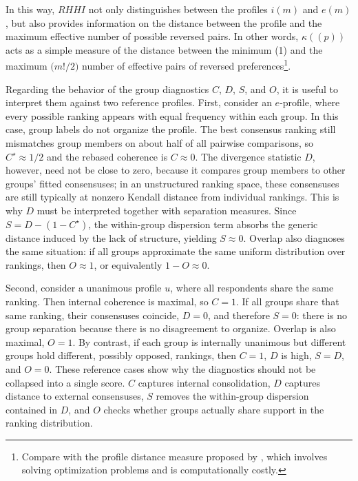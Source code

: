 \documentclass[12pt]{article}
\begin{document}
In this way, \(RHHI\) not only distinguishes between the profiles \(i(m)\) and \(e(m)\), but also provides information on the distance between the profile and the maximum effective number of possible reversed pairs. In other words, \(\kappa((p))\) acts as a simple measure of the distance between the minimum (1) and the maximum \(\bigl(m!/2\bigr)\) number of effective pairs of reversed preferences\footnote{Compare with the profile distance measure proposed by \textcite{szufa2024map}, which involves solving optimization problems and is computationally costly.}.




Regarding the behavior of the group diagnostics \(C\), \(D\), \(S\), and \(O\), it is useful to interpret them against two reference profiles. First, consider an \(e\)-profile, where every possible ranking appears with equal frequency within each group. In this case, group labels do not organize the profile. The best consensus ranking still mismatches group members on about half of all pairwise comparisons, so \(C^{\star}\approx 1/2\) and the rebased coherence is \(C\approx 0\). The divergence statistic \(D\), however, need not be close to zero, because it compares group members to other groups' fitted consensuses; in an unstructured ranking space, these consensuses are still typically at nonzero Kendall distance from individual rankings. This is why \(D\) must be interpreted together with separation measures. Since \(S=D-(1-C^{\star})\), the within-group dispersion term absorbs the generic distance induced by the lack of structure, yielding \(S\approx 0\). Overlap also diagnoses the same situation: if all groups approximate the same uniform distribution over rankings, then \(O\approx 1\), or equivalently \(1-O\approx 0\).

Second, consider a unanimous profile \(u\), where all respondents share the same ranking. Then internal coherence is maximal, so \(C=1\). If all groups share that same ranking, their consensuses coincide, \(D=0\), and therefore \(S=0\): there is no group separation because there is no disagreement to organize. Overlap is also maximal, \(O=1\). By contrast, if each group is internally unanimous but different groups hold different, possibly opposed, rankings, then \(C=1\), \(D\) is high, \(S=D\), and \(O = 0\). These reference cases show why the diagnostics should not be collapsed into a single score. \(C\) captures internal consolidation, \(D\) captures distance to external consensuses, \(S\) removes the within-group dispersion contained in \(D\), and \(O\) checks whether groups actually share support in the ranking distribution.
\end{document}
